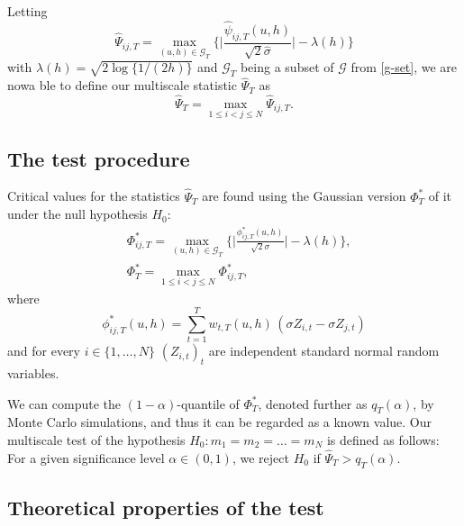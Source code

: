 \documentclass[a4paper,12pt]{article}
\numberwithin{equation}{section}
\begin{document}
Letting 
\[ \widehat{\Psi}_{ij,T} = \max_{(u,h) \in \mathcal{G}_T} \Big\{ \Big|\frac{\widehat{\psi}_{ij,T}(u,h)}{\sqrt{2}\widehat{\sigma}}\Big| - \lambda(h) \Big\} \] 
with $\lambda(h) = \sqrt{2 \log \{ 1/(2h) \}}$ and $\mathcal{G}_T$ being a subset of $\mathcal{G}$ from \eqref{g-set},
we are nowa ble to define our multiscale statistic $\widehat{\Psi}_T$ as
\[ \widehat{\Psi}_T = \max_{1 \le i < j \le N} \widehat{\Psi}_{ij,T}. \]


\subsection{The test procedure}\label{subsec-test-equality-test}

Critical values for the statistics $\widehat{\Psi}_T$ are found using the Gaussian version $\Phi_T^*$ of it under the null hypothesis $H_0$:
\begin{align*}
&\Phi_{ij, T}^* =  \max_{(u,h) \in \mathcal{G}_T} \Big\{ \Big|\frac{\phi_{ij,T}^*(u,h)}{\sqrt{2} \sigma}\Big| - \lambda(h) \Big\},\\
&\Phi_T^* = \max_{1\le i < j \le N} \Phi_{ij, T}^*,
\end{align*} 
where
\[ \phi_{ij,T}^*(u,h) = \sum\limits_{t=1}^T w_{t,T}(u,h) \, (\sigma Z_{i,t} - \sigma Z_{j,t}) \]
and for every $i \in \{1, \ldots, N\}$ $(Z_{i,t})_t$ are independent standard normal random variables.
 
We can compute the $(1-\alpha)$-quantile of $\Phi_T^*$, denoted further as $q_T(\alpha)$, by Monte Carlo simulations, and thus it can be regarded as a known value. Our multiscale test of the hypothesis $H_0: m_1 = m_2 = \ldots = m_N$ is defined as follows: For a given significance level $\alpha \in (0,1)$, we reject $H_0$ if $\widehat{\Psi}_T > q_T(\alpha)$. 

\subsection{Theoretical properties of the test}\label{subsec-test-equality-theo}
\end{document}
